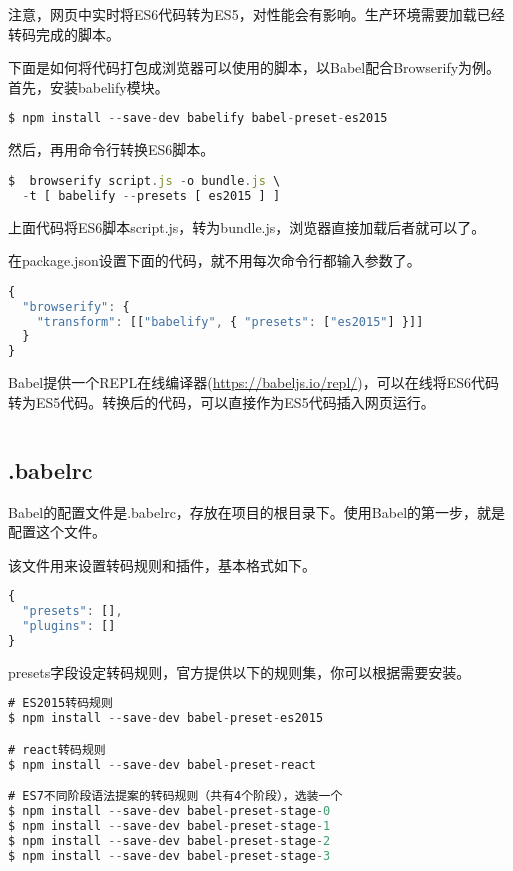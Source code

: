 注意，网页中实时将ES6代码转为ES5，对性能会有影响。生产环境需要加载已经转码完成的脚本。

下面是如何将代码打包成浏览器可以使用的脚本，以Babel配合Browserify为例。首先，安装babelify模块。

\begin{lstlisting}[language=JavaScript]
$ npm install --save-dev babelify babel-preset-es2015
\end{lstlisting}

然后，再用命令行转换ES6脚本。

\begin{lstlisting}[language=JavaScript]
$  browserify script.js -o bundle.js \
  -t [ babelify --presets [ es2015 ] ]
\end{lstlisting}

上面代码将ES6脚本script.js，转为bundle.js，浏览器直接加载后者就可以了。

在package.json设置下面的代码，就不用每次命令行都输入参数了。


\begin{lstlisting}[language=JavaScript]
{
  "browserify": {
    "transform": [["babelify", { "presets": ["es2015"] }]]
  }
}
\end{lstlisting}

Babel提供一个REPL在线编译器(\url{https://babeljs.io/repl/})，可以在线将ES6代码转为ES5代码。转换后的代码，可以直接作为ES5代码插入网页运行。

\begin{lstlisting}[language=JavaScript]

\end{lstlisting}



\subsection{.babelrc}



Babel的配置文件是.babelrc，存放在项目的根目录下。使用Babel的第一步，就是配置这个文件。


该文件用来设置转码规则和插件，基本格式如下。



\begin{lstlisting}[language=JavaScript]
{
  "presets": [],
  "plugins": []
}
\end{lstlisting}

presets字段设定转码规则，官方提供以下的规则集，你可以根据需要安装。


\begin{lstlisting}[language=JavaScript]
# ES2015转码规则
$ npm install --save-dev babel-preset-es2015

# react转码规则
$ npm install --save-dev babel-preset-react

# ES7不同阶段语法提案的转码规则（共有4个阶段），选装一个
$ npm install --save-dev babel-preset-stage-0
$ npm install --save-dev babel-preset-stage-1
$ npm install --save-dev babel-preset-stage-2
$ npm install --save-dev babel-preset-stage-3
\end{lstlisting}

